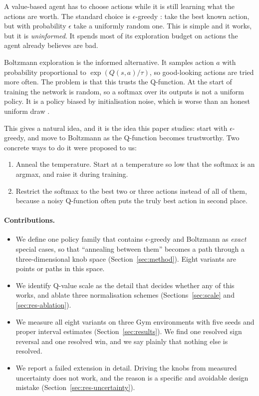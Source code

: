 \documentclass[11pt,a4paper]{article}
\begin{document}
A value-based agent has to choose actions while it is still learning what the
actions are worth. The standard choice is $\epsilon$-greedy \cite{sutton2018}: take the best
known action, but with probability $\epsilon$ take a uniformly random one. This
is simple and it works, but it is \emph{uninformed}. It spends most of its
exploration budget on actions the agent already believes are bad.

Boltzmann exploration is the informed alternative. It samples action $a$ with
probability proportional to $\exp(Q(s,a)/\tau)$, so good-looking actions are
tried more often. The problem is that this trusts the Q-function. At the start
of training the network is random, so a softmax over its outputs is not a
uniform policy. It is a policy biased by initialisation noise, which is worse
than an honest uniform draw \cite{cesabianchi2017}.

This gives a natural idea, and it is the idea this paper studies: start with
$\epsilon$-greedy, and move to Boltzmann as the Q-function becomes
trustworthy. Two concrete ways to do it were proposed to us:

\begin{enumerate}
\item Anneal the temperature. Start at a temperature so low that the softmax is
      an argmax, and raise it during training.
\item Restrict the softmax to the best two or three actions instead of all of
      them, because a noisy Q-function often puts the truly best action in
      second place.
\end{enumerate}

\paragraph{Contributions.}
\begin{itemize}
\item We define one policy family that contains $\epsilon$-greedy and Boltzmann
      as \emph{exact} special cases, so that ``annealing between them'' becomes
      a path through a three-dimensional knob space (Section~\ref{sec:method}).
      Eight variants are points or paths in this space.
\item We identify Q-value scale as the detail that decides whether any of this
      works, and ablate three normalisation schemes
      (Sections~\ref{sec:scale} and \ref{sec:res-ablation}).
\item We measure all eight variants on three Gym environments with five seeds
      and proper interval estimates (Section~\ref{sec:results}). We find one
      resolved sign reversal and one resolved win, and we say plainly that
      nothing else is resolved.
\item We report a failed extension in detail. Driving the knobs from measured
      uncertainty does not work, and the reason is a specific and avoidable
      design mistake (Section~\ref{sec:res-uncertainty}).
\end{itemize}
\end{document}
